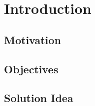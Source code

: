 \documentclass[final_report.tex]{subfiles}
\begin{document}
\section{Introduction}

\subsection{Motivation}
\subsection{Objectives}
\subsection{Solution Idea}
\end{document}
